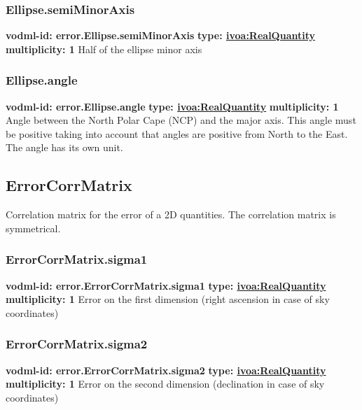     \subsubsection{Ellipse.semiMinorAxis}
      \textbf{vodml-id: error.Ellipse.semiMinorAxis} \newline
      \textbf{type: \hyperref[sect:ivoa]{ivoa:RealQuantity}} \newline
      \textbf{multiplicity: 1} \newline 
      Half of the ellipse minor axis

    \subsubsection{Ellipse.angle}
      \textbf{vodml-id: error.Ellipse.angle} \newline
      \textbf{type: \hyperref[sect:ivoa]{ivoa:RealQuantity}} \newline
      \textbf{multiplicity: 1} \newline 
      Angle between the North Polar Cape (NCP) and the major axis. This angle must be positive taking into account that angles are positive from North to the East. The angle has its own unit.

  \subsection{ErrorCorrMatrix}
  \label{sect:error.ErrorCorrMatrix}
    Correlation matrix for the error of a 2D quantities. The correlation matrix is symmetrical.

    \subsubsection{ErrorCorrMatrix.sigma1}
      \textbf{vodml-id: error.ErrorCorrMatrix.sigma1} \newline
      \textbf{type: \hyperref[sect:ivoa]{ivoa:RealQuantity}} \newline
      \textbf{multiplicity: 1} \newline 
      Error on the first dimension (right ascension in case of sky coordinates)

    \subsubsection{ErrorCorrMatrix.sigma2}
      \textbf{vodml-id: error.ErrorCorrMatrix.sigma2} \newline
      \textbf{type: \hyperref[sect:ivoa]{ivoa:RealQuantity}} \newline
      \textbf{multiplicity: 1} \newline 
      Error on the second dimension (declination in case of sky coordinates)

